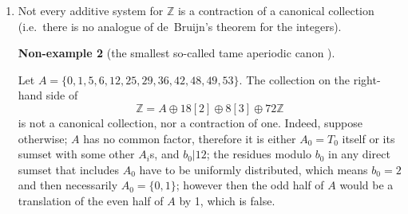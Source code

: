 \documentclass[12pt]{article}
\theoremstyle{definition}
\newtheorem{nonexample}{Non-example}
\newcommand{\Z}{\mathbb{Z}}
\begin{document}
\begin{enumerate}
\begin{nonexample}
	\end{nonexample}
	Generally, even if the elements from the union of a canonical collection have no common factor, the sumset of that collection can be sparse and have gaps.
	In that case, using the sequences $(b_i)$ and $(T_i)$, one can still formally write down the expansion $n=a_0+a_1+\dotsb$ (as noted in the proof for Fact \ref{p:dir}) even for $n$ not in the sumset, but that expansion will not eventually settle to zero.
\item Not every additive system for $\Z$ is a contraction of a canonical collection (i.e.\ there is no analogue of de~Bruijn's theorem for the integers).
	\begin{nonexample}[the smallest so-called tame aperiodic canon \cite{aperiodic}]
	\label{ex:aperiodic}~

	Let $A=\{0, 1, 5, 6, 12, 25, 29, 36, 42, 48, 49, 53\}$. The collection on the right-hand side of
	\[
	\Z = A \oplus 18[2] \oplus 8[3] \oplus 72\Z
	\]
	is not a canonical collection, nor a contraction of one. Indeed, suppose otherwise; $A$ has no common factor, therefore it is either $A_0=T_0$ itself or its sumset with some other $A_i$s, and $b_0|12$; the residues modulo $b_0$ in any direct sumset that includes $A_0$ have to be uniformly distributed, which means $b_0=2$ and then necessarily $A_0=\{0,1\}$; however then the odd half of $A$ would be a translation of the even half of $A$ by 1, which is false.
	\end{nonexample}

\begin{figure}
\centering
{}
\end{figure}
\end{enumerate}
\end{document}
